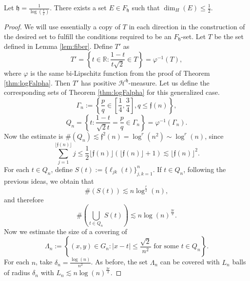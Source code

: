 \documentclass[11pt,a4paper]{amsart}
\begin{document}
\begin{theorem}\label{thm:sqrth3/2}
Let ${\mathfrak{h}}=\frac{1}{\log(\frac{1}{x})}$. There exists a set $E\in
F_{\mathfrak{h}}$ such that $\dim_H(E)\le \frac{1}{2}$.
\end{theorem}

\begin{proof}
We will use essentially a copy of $T$ in each direction in the construction of the desired set to fulfill the conditions required to be an $F_{\mathfrak{h}}$-set. Let $T$ be the set defined in Lemma \ref{lem:fiber}. Define $T'$ as
\begin{equation*}
T'=\left\{t\in{\mathbb{R}}:\frac{1-t}{t\sqrt{2}}\in
T\right\}=\varphi^{-1}(T),
\end{equation*}
where $\varphi$ is the same bi-Lipschitz function from the proof of Theorem \ref{thm:logFalpha}. Then $T'$ has positive ${\mathcal{H}^{{\mathfrak{h}}}}$-measure. Let us define the
corresponding sets of Theorem \ref{thm:logFalpha} for this generalized case.
\begin{equation*}
\Gamma_n:=\left\{\frac{p}{q}\in\left[\frac{1}{4},\frac{3}{4}\right],
q\le {\mathfrak{f}}(n)\right\},
\end{equation*}
\begin{equation*}
Q_n=\left\{ t:\frac{1-t}{\sqrt{2}t}=\frac{p}{q}\in
\Gamma_n\right\}=\varphi^{-1}(\Gamma_n).
\end{equation*}
Now the estimate is $\#(Q_n)\lesssim
{\mathfrak{f}}^{2}(n)=\log^r(n^2)\sim\log^r(n)$, since
\begin{equation*}
\sum_{j=1}^{\lfloor {\mathfrak{f}}(n)\rfloor}j\le \frac{1}{2} \lfloor
{\mathfrak{f}}(n)\rfloor(\lfloor {\mathfrak{f}}(n)\rfloor+1) \lesssim \lfloor
{\mathfrak{f}}(n)\rfloor^2.
\end{equation*}
For each $t\in Q_n$, define $S(t):=\{\ell_{jk}(t)\}_{j,k=1}^n$.
If $t\in Q_n$, following the previous ideas, we obtain that
\begin{equation*}
\#(S(t))\lesssim n\log^\frac{r}{2}(n),
\end{equation*}
and therefore
\begin{equation*}
\#\left(\bigcup_{t\in Q_n}S(t)\right)\lesssim
n\log(n)^{\frac{3r}{2}}.
\end{equation*}
Now we estimate the size of a covering of
\begin{equation*}
\Lambda_n:=\left\{(x,y)\in G_n: |x-t|\le \frac{\sqrt{2}}{n^2}\text{ for
some } t\in Q_n\right\}.
\end{equation*}
For each $n$, take $\delta_n=\frac{\log(n)}{n^2}$. As before, the
set $\Lambda_n$ can be covered with  $L_n$ balls of radius
$\delta_n$ with $L_n\lesssim n\log(n)^\frac{3r}{2}$.


\end{proof}
\end{document}
